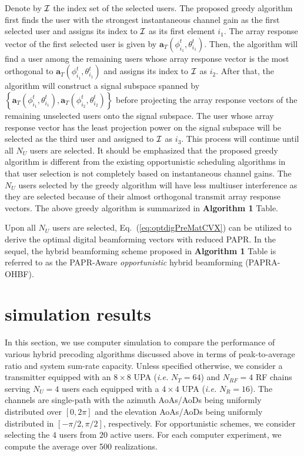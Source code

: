 \documentclass[conference]{IEEEtran}
\begin{document}
Denote by $\cal{I}$ the index set of the selected users. The proposed greedy algorithm first finds the user with the strongest instantaneous channel gain as the first selected user and assigns its index to $\cal{I}$ as its first element $i_1$. The array response vector of the first selected user is given by $\bm{a}_{T}\left(\phi^t_{i_1},\theta^t_{i_1}\right)$. Then, the algorithm will find a user among the remaining users whose array response vector is the most orthogonal to $\bm{a}_{T}\left(\phi^t_{i_1},\theta^t_{i_1}\right)$ and assigns its index to $\cal{I}$ as $i_2$. After that, the algorithm will construct a signal subspace spanned by $\left\{\bm{a}_{T}\left(\phi^t_{i_1},\theta^t_{i_1}\right),\bm{a}_{T}\left(\phi^t_{i_2},\theta^t_{i_2}\right)\right\}$ before projecting the array response vectors of the remaining unselected users onto the signal subspace. The user whose array response vector has the least projection power on the signal subspace will be selected as the third user and assigned to $\cal{I}$ as $i_3$. This process will continue until all $N_U$ users are selected. It should be emphasized that the proposed greedy algorithm is different from the existing opportunistic scheduling algorithms in that user selection is not completely based on instantaneous channel gains. The $N_U$ users selected by the greedy algorithm will have less multiuser interference as they are selected because of their almost orthogonal transmit array response vectors. The above greedy algorithm is summarized in {\bf Algorithm 1} Table.

Upon all $N_U$ users are selected, Eq.~(\ref{eq:optdigPreMatCVX}) can be utilized to derive the optimal digital beamforming vectors with reduced PAPR. In the sequel, the hybrid beamforming scheme proposed in {\bf Algorithm 1} Table is referred to as the PAPR-Aware {\em opportunistic} hybrid beamforming (PAPRA-OHBF).



\section{simulation results}
In this section, we use computer simulation to compare the performance of various hybrid precoding algorithms discussed above in terms of peak-to-average ratio and system sum-rate capacity. Unless specified otherwise, we consider a transmitter equipped with an $8\times 8$ UPA ({\em i.e.} $N_T=64$) and $N_{RF}=4$ RF chains serving $N_U=4$ users each equipped with a $4\times 4$ UPA ({\em i.e.} $N_R=16$). The channels are single-path with the azimuth AoAs/AoDs being uniformly distributed over $[0, 2\pi]$ and the elevation AoAs/AoDs being uniformly distributed in $[-\pi/2, \pi/2]$, respectively. For opportunistic schemes, we consider selecting the $4$ users from $20$ active users. For each computer experiment, we compute the average over 500 realizations.
\end{document}
